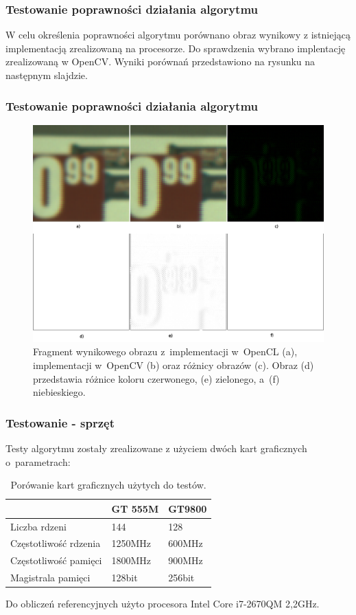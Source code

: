 \documentclass{beamer}
\begin{document}
\begin{frame}
  \frametitle{Testowanie poprawności działania algorytmu}

W celu określenia poprawności algorytmu porównano obraz wynikowy z istniejącą implementacją zrealizowaną na procesorze. Do sprawdzenia wybrano implentację zrealizowaną w OpenCV. Wyniki porównań przedstawiono na rysunku na następnym slajdzie.

\end{frame}

\begin{frame}
  \frametitle{Testowanie poprawności działania algorytmu}
\begin{figure}
  \centering
  \includegraphics[width=0.55\linewidth]{result_diff}
  \caption{Fragment wynikowego obrazu z~implementacji w~OpenCL (a), implementacji w~OpenCV (b) oraz różnicy obrazów (c). Obraz (d) przedstawia różnice koloru czerwonego, (e) zielonego, a~(f) niebieskiego.}
  \label{fig:result_diff}
\end{figure}
\end{frame}

\begin{frame}
  \frametitle{Testowanie - sprzęt}
  Testy algorytmu zostały zrealizowane z użyciem dwóch kart graficznych o~parametrach:
\begin{center}
\begin{table}
   \begin{tabular}{ |l | l | l | }
     \hline
       & GT 555M & GT9800 \\ \hline
     Liczba rdzeni & 144 & 128 \\ \hline
     Częstotliwość rdzenia & 1250MHz & 600MHz \\ \hline
     Częstotliwość pamięci & 1800MHz & 900MHz \\ \hline
     Magistrala pamięci & 128bit & 256bit \\ \hline

   \end{tabular}
  \caption{Porówanie kart graficznych użytych do testów.}
  \label{tab:gpus}
\end{table}
\end{center}
Do obliczeń referencyjnych użyto procesora Intel Core i7-2670QM 2,2GHz.
\end{frame}
\end{document}
